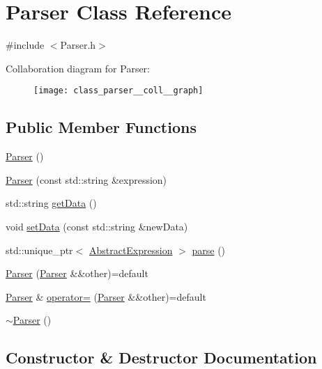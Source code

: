 \hypertarget{class_parser}{}\section{Parser Class Reference}
\label{class_parser}


{\ttfamily \#include $<$Parser.\+h$>$}



Collaboration diagram for Parser\+:
\nopagebreak
\begin{figure}[H]
\begin{center}
\leavevmode
\texttt{[image: class\_parser\_\_coll\_\_graph]}
\end{center}
\end{figure}
\subsection*{Public Member Functions}
\begin{DoxyCompactItemize}
\item 
\mbox{\hyperlink{class_parser_a12234f6cd36b61af4b50c94a179422c1}{Parser}} ()
\item 
\mbox{\hyperlink{class_parser_af4b479fd24e72f6dcd096f6e7531f2c5}{Parser}} (const std\+::string \&expression)
\item 
std\+::string \mbox{\hyperlink{class_parser_ab5ad92e6627ff58dc031dd7ce0603bee}{get\+Data}} ()
\item 
void \mbox{\hyperlink{class_parser_a31ff3ae9be8e40870564ff18e50cd69f}{set\+Data}} (const std\+::string \&new\+Data)
\item 
std\+::unique\+\_\+ptr$<$ \mbox{\hyperlink{class_abstract_expression}{Abstract\+Expression}} $>$ \mbox{\hyperlink{class_parser_a1f546b5f1882a1a6bdd056ebfe606799}{parse}} ()
\item 
\mbox{\hyperlink{class_parser_aaf729e2242d0c651412faea209cb879f}{Parser}} (\mbox{\hyperlink{class_parser}{Parser}} \&\&other)=default
\item 
\mbox{\hyperlink{class_parser}{Parser}} \& \mbox{\hyperlink{class_parser_a32a46aa1930b03db3f9386e7cd823eeb}{operator=}} (\mbox{\hyperlink{class_parser}{Parser}} \&\&other)=default
\item 
\mbox{\hyperlink{class_parser_a3e658b5917a93a3ef648050d060e3a93}{$\sim$\+Parser}} ()
\end{DoxyCompactItemize}


\subsection{Constructor \& Destructor Documentation}
\mbox{\label{class_parser_a12234f6cd36b61af4b50c94a179422c1}} 
